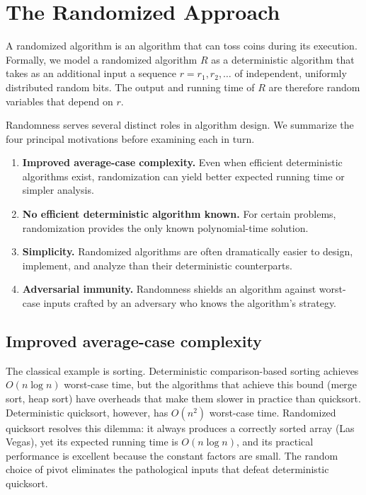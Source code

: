 \documentclass[twoside,12pt]{book}
\theoremstyle{plain}
\theoremstyle{definition}
\theoremstyle{remark}
\begin{document}
\section{The Randomized Approach}
\label{sec:randomized-approach}

A randomized algorithm is an algorithm that can toss coins during its
execution. Formally, we model a randomized algorithm $R$ as a deterministic
algorithm that takes as an additional input a sequence
$r = r_1, r_2, \ldots$ of independent, uniformly distributed random
bits. The output and running time of $R$ are therefore random variables
that depend on $r$.

Randomness serves several distinct roles in algorithm design. We summarize
the four principal motivations before examining each in turn.

\begin{enumerate}
\item \textbf{Improved average-case complexity.} Even when efficient
deterministic algorithms exist, randomization can yield better expected
running time or simpler analysis.
\item \textbf{No efficient deterministic algorithm known.} For certain
problems, randomization provides the only known polynomial-time solution.
\item \textbf{Simplicity.} Randomized algorithms are often dramatically
easier to design, implement, and analyze than their deterministic
counterparts.
\item \textbf{Adversarial immunity.} Randomness shields an algorithm
against worst-case inputs crafted by an adversary who knows the algorithm's
strategy.
\end{enumerate}

\subsection{Improved average-case complexity}

The classical example is sorting. Deterministic comparison-based sorting
achieves $O(n \log n)$ worst-case time, but the algorithms that achieve
this bound (merge sort, heap sort) have overheads that make them slower in
practice than quicksort. Deterministic quicksort, however, has $O(n^2)$
worst-case time. Randomized quicksort resolves this dilemma: it always
produces a correctly sorted array (Las Vegas), yet its expected running
time is $O(n \log n)$, and its practical performance is excellent because
the constant factors are small. The random choice of pivot eliminates the
pathological inputs that defeat deterministic quicksort.
\end{document}
